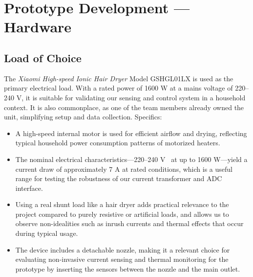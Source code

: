 \documentclass[11pt,a4paper]{article}
\begin{document}
\newpage
\section{Prototype Development --- Hardware}

\subsection{Load of Choice}

\noindent The \emph{Xiaomi High-speed Ionic Hair Dryer} Model GSHGL01LX is used as the primary electrical load. With a rated power of 1600 W at a mains voltage of 220–240 V, it is suitable for validating our sensing and control system in a household context. It is also commonplace, as one of the team members already owned the unit, simplifying setup and data collection. Specifics: \begin{itemize}
    \item A high-speed internal motor is used for efficient airflow and drying, reflecting typical household power consumption patterns of motorized heaters.
    \item The nominal electrical characteristics—220–240 V~ at up to 1600 W—yield a current draw of approximately 7 A at rated conditions, which is a useful range for testing the robustness of our current transformer and ADC interface.
    \item Using a real shunt load like a hair dryer adds practical relevance to the project compared to purely resistive or artificial loads, and allows us to observe non-idealities such as inrush currents and thermal effects that occur during typical usage.
    \item The device includes a detachable nozzle, making it a relevant choice for evaluating non-invasive current sensing and thermal monitoring for the prototype by inserting the sensors between the nozzle and the main outlet.
\end{itemize}
\end{document}
